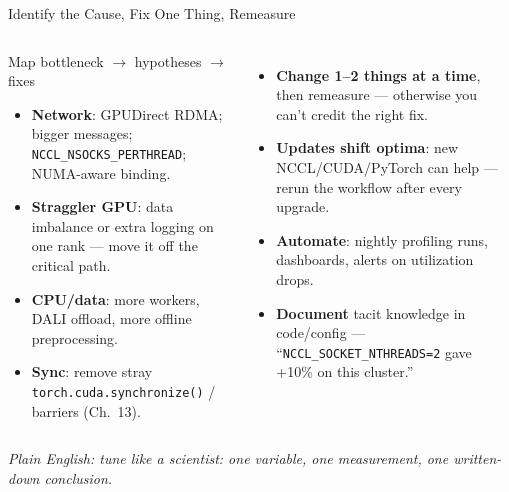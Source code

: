 \documentclass[aspectratio=169]{beamer}
\newcommand{\kw}[1]{\textbf{\textcolor{kwblue}{#1}}}
\newcommand{\pe}[1]{\par{\setlength{\fboxsep}{2.5pt}\noindent\colorbox{navy!9}{\parbox{\dimexpr\textwidth-5pt\relax}{\footnotesize\itshape Plain English: #1}}}}
\begin{document}
\begin{frame}{Identify the Cause, Fix One Thing, Remeasure}
  \begin{columns}[t]
    \begin{block}{Map bottleneck $\to$ hypotheses $\to$ fixes}
      \small
      \begin{itemize}\small
        \item \kw{Network}: GPUDirect RDMA; bigger messages;
              \texttt{NCCL\_NSOCKS\_PERTHREAD}; NUMA-aware binding.
        \item \kw{Straggler GPU}: data imbalance or extra logging on one rank ---
              move it off the critical path.
        \item \kw{CPU/data}: more workers, DALI offload, more offline preprocessing.
        \item \kw{Sync}: remove stray \texttt{torch.cuda.synchronize()} / barriers (Ch.\ 13).
      \end{itemize}
    \end{block}
    \begin{itemize}\small
      \item \kw{Change 1--2 things at a time}, then remeasure --- otherwise you can't
            credit the right fix.
      \item \kw{Updates shift optima}: new NCCL/CUDA/PyTorch can help --- rerun the
            workflow after every upgrade.
      \item \kw{Automate}: nightly profiling runs, dashboards, alerts on utilization drops.
      \item \kw{Document} tacit knowledge in code/config ---
            ``\texttt{NCCL\_SOCKET\_NTHREADS=2} gave +10\% on this cluster.''
    \end{itemize}
  \end{columns}
  \pe{tune like a scientist: one variable, one measurement, one written-down conclusion.}
\end{frame}
\end{document}
